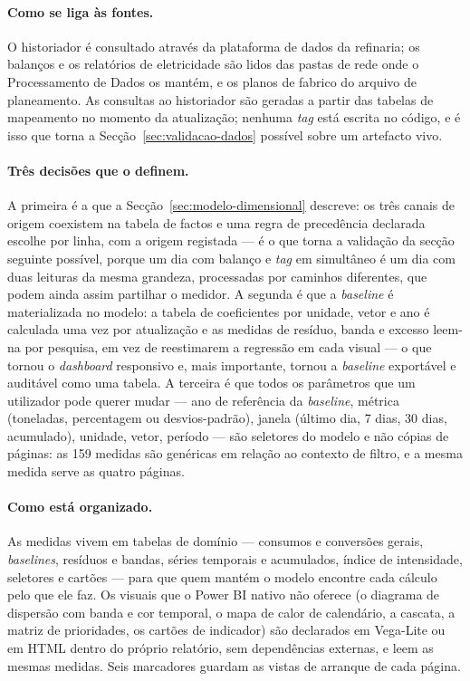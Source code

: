 \paragraph{Como se liga às fontes.} O historiador é consultado através da
plataforma de dados da refinaria; os balanços e os relatórios de
eletricidade são lidos das pastas de rede onde o Processamento de Dados os
mantém, e os planos de fabrico do arquivo de planeamento. As consultas ao
historiador são geradas a partir das tabelas de mapeamento no momento da
atualização; nenhuma \emph{tag} está escrita no código, e é isso que torna
a Secção~\ref{sec:validacao-dados} possível sobre um artefacto vivo.

\paragraph{Três decisões que o definem.} A primeira é a que a
Secção~\ref{sec:modelo-dimensional} descreve: os três canais de origem
coexistem na tabela de factos e uma regra de precedência declarada escolhe
por linha, com a origem registada --- é o que torna a validação da secção
seguinte possível, porque um dia com balanço e \emph{tag} em simultâneo é
um dia com duas leituras da mesma grandeza, processadas por caminhos
diferentes, que podem ainda assim partilhar o medidor. A segunda é que a
\emph{baseline} é materializada no modelo: a tabela de coeficientes por
unidade, vetor e ano é calculada uma vez por atualização e as medidas de
resíduo, banda e excesso leem-na por pesquisa, em vez de reestimarem a
regressão em cada visual --- o que tornou o \emph{dashboard} responsivo e,
mais importante, tornou a \emph{baseline} exportável e auditável como uma
tabela. A terceira é que todos os parâmetros que um utilizador pode querer
mudar --- ano de referência da \emph{baseline}, métrica (toneladas,
percentagem ou desvios-padrão), janela (último dia, 7 dias, 30 dias,
acumulado), unidade, vetor, período --- são seletores do modelo e não
cópias de páginas: as 159 medidas são genéricas em relação ao contexto de
filtro, e a mesma medida serve as quatro páginas.

\paragraph{Como está organizado.} As medidas vivem em tabelas de domínio
--- consumos e conversões gerais, \emph{baselines}, resíduos e bandas,
séries temporais e acumulados, índice de intensidade, seletores e cartões
--- para que quem mantém o modelo encontre cada cálculo pelo que ele faz.
Os visuais que o Power BI nativo não oferece (o diagrama de dispersão com
banda e cor temporal, o mapa de calor de calendário, a cascata, a matriz
de prioridades, os cartões de indicador) são declarados em Vega-Lite ou em
HTML dentro do próprio relatório, sem dependências externas, e leem as
mesmas medidas. Seis marcadores guardam as vistas de arranque de cada
página.


